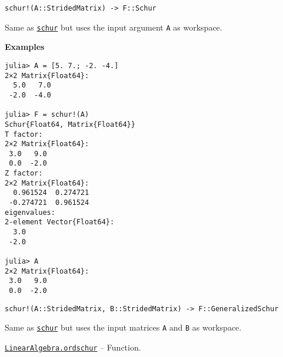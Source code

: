 \begin{adjustwidth}{2em}{0pt}


\begin{verbatim}
schur!(A::StridedMatrix) -> F::Schur
\end{verbatim}

Same as \hyperlink{17132870828407138368}{\texttt{schur}} but uses the input argument \texttt{A} as workspace.

\textbf{Examples}


\begin{verbatim}
julia> A = [5. 7.; -2. -4.]
2×2 Matrix{Float64}:
  5.0   7.0
 -2.0  -4.0

julia> F = schur!(A)
Schur{Float64, Matrix{Float64}}
T factor:
2×2 Matrix{Float64}:
 3.0   9.0
 0.0  -2.0
Z factor:
2×2 Matrix{Float64}:
  0.961524  0.274721
 -0.274721  0.961524
eigenvalues:
2-element Vector{Float64}:
  3.0
 -2.0

julia> A
2×2 Matrix{Float64}:
 3.0   9.0
 0.0  -2.0
\end{verbatim}




\begin{lstlisting}
schur!(A::StridedMatrix, B::StridedMatrix) -> F::GeneralizedSchur
\end{lstlisting}

Same as \hyperlink{17132870828407138368}{\texttt{schur}} but uses the input matrices \texttt{A} and \texttt{B} as workspace.



\end{adjustwidth}
\hypertarget{4329711108255537481}{}
\hyperlink{4329711108255537481}{\texttt{LinearAlgebra.ordschur}}  -- {Function.}

